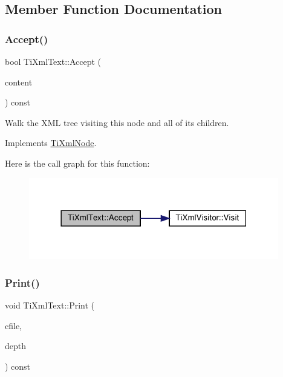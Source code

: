 \subsection{Member Function Documentation}
\mbox{\label{classTiXmlText_af65964326eac4640bfb97d4622fa0de2}} 
\subsubsection{\texorpdfstring{Accept()}{Accept()}}
{\footnotesize\ttfamily bool Ti\+Xml\+Text\+::\+Accept (\begin{DoxyParamCaption}\item[{\hyperlink{classTiXmlVisitor}{Ti\+Xml\+Visitor} $\ast$}]{content }\end{DoxyParamCaption}) const\hspace{0.3cm}{\ttfamily [virtual]}}

Walk the X\+ML tree visiting this node and all of its children. 

Implements \hyperlink{classTiXmlNode_acc0f88b7462c6cb73809d410a4f5bb86}{Ti\+Xml\+Node}.

Here is the call graph for this function\+:
\nopagebreak
\begin{figure}[H]
\begin{center}
\leavevmode
\includegraphics[width=309pt]{classTiXmlText_af65964326eac4640bfb97d4622fa0de2_cgraph}
\end{center}
\end{figure}
\mbox{\label{classTiXmlText_a75f6895906333894e2574cc8cf77ea79}} 
\subsubsection{\texorpdfstring{Print()}{Print()}}
{\footnotesize\ttfamily void Ti\+Xml\+Text\+::\+Print (\begin{DoxyParamCaption}\item[{F\+I\+LE $\ast$}]{cfile,  }\item[{int}]{depth }\end{DoxyParamCaption}) const\hspace{0.3cm}{\ttfamily [virtual]}}

